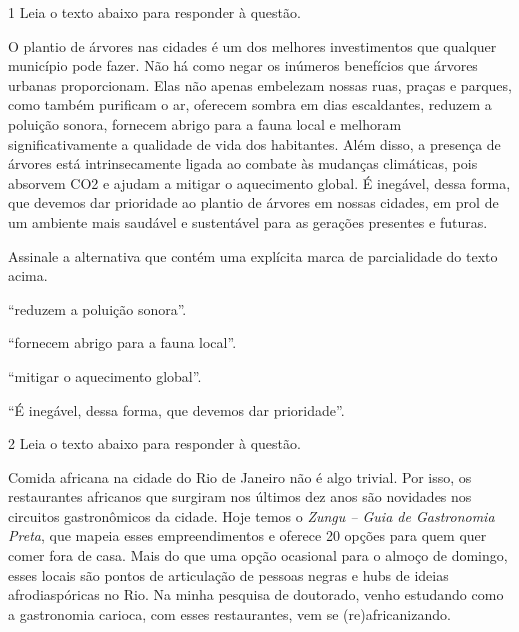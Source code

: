 \num{1} Leia o texto abaixo para responder à questão.

\begin{myquote}
O plantio de árvores nas cidades é um dos melhores investimentos que qualquer 
município pode fazer. Não há como negar os inúmeros benefícios que árvores urbanas 
proporcionam. Elas não apenas embelezam nossas ruas, praças e parques, como também purificam
o ar, oferecem sombra em dias escaldantes, reduzem a poluição sonora, fornecem
abrigo para a fauna local e melhoram significativamente a qualidade de vida
dos habitantes. Além disso, a presença de árvores está intrinsecamente ligada
ao combate às mudanças climáticas, pois absorvem CO2 e ajudam a mitigar o
aquecimento global. É inegável, dessa forma, que devemos dar prioridade ao plantio
de árvores em nossas cidades, em prol de um ambiente mais saudável e
sustentável para as gerações presentes e futuras.


\end{myquote}

Assinale a alternativa que contém uma explícita marca de parcialidade do texto acima.

\begin{escolha}

  \item ``reduzem a poluição sonora''.
  \item ``fornecem abrigo para a fauna local''.
  \item ``mitigar o aquecimento global''.
  \item ``É inegável, dessa forma, que devemos dar prioridade''. 

\end{escolha}

\num{2} Leia o texto abaixo para responder à questão.

\begin{myquote}
Comida africana na cidade do Rio de Janeiro não é algo trivial. Por isso, os
restaurantes africanos que surgiram nos últimos dez anos são novidades nos
circuitos gastronômicos da cidade. Hoje temos o \textit{Zungu -- Guia de Gastronomia
Preta}, que mapeia esses empreendimentos e oferece 20 opções para quem quer
comer fora de casa. Mais do que uma opção ocasional para o almoço de domingo,
esses locais são pontos de articulação de pessoas negras e hubs de ideias
afrodiaspóricas no Rio. Na minha pesquisa de doutorado, venho estudando como a
gastronomia carioca, com esses restaurantes, vem se (re)africanizando.

\end{myquote}


